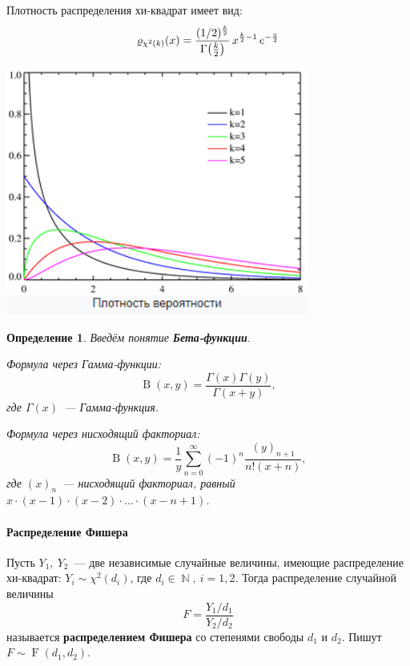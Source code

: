 \documentclass[12pt]{article}
\DeclareMathOperator{\NN}{\mathbb{N}}
\DeclareMathOperator{\Fshr}{F}
\DeclareMathOperator{\Beta}{B}
\newtheorem*{definition*}{Определение}
\begin{document}
    Плотность распределения хи-квадрат имеет вид:
    \begin{equation*}
        \varrho_{\chi^2(k)}(x) = \frac{(1/2)^{k \over 2}}{\Gamma\!\left({k \over 2}\right)}\, x^{{k \over 2} - 1}\, e^{-\frac{x}{2}}
    \end{equation*}
    \begin{center}
        \includegraphics[width=10cm]{chi-square.png}
    \end{center}

    \begin{definition*}
        Введём понятие \textbf{Бета-функции}. 
        
        Формула через Гамма-функции:
        \begin{equation*}
            \Beta(x,y) = \frac{\Gamma(x) \Gamma(y)}{\Gamma(x + y)},
        \end{equation*}     
        где $\Gamma(x)$~--- Гамма-функция.
        
        Формула через нисходящий факториал:
        \begin{equation*}
            \Beta(x,y) = \frac{1}{y} \sum_{n=0}^{\infty} (-1)^n \frac{\left(y\right)_{n+1}}{n!\left(x + n\right)},
        \end{equation*}
        где $\left(x\right)_n$~--- нисходящий факториал, равный $x \cdot (x - 1) \cdot (x - 2) \cdot \ldots \cdot (x - n + 1)$.
    \end{definition*}
    
    \paragraph{Распределение Фишера}
    Пусть $Y_1,\ Y_2$~--- две независимые случайные величины, имеющие распределение хи-квадрат: $Y_i \sim \chi^2(d_i)$, где $d_i \in \NN,\ i = 1, 2$.
    Тогда распределение случайной величины 
    \begin{equation*}
        F = \frac{Y_1/d_1}{Y_2/d_2}
    \end{equation*}
    называется \textbf{распределением Фишера} со степенями свободы $d_1$ и $d_2$. Пишут $F \sim \Fshr(d_1, d_2)$.
\end{document}
